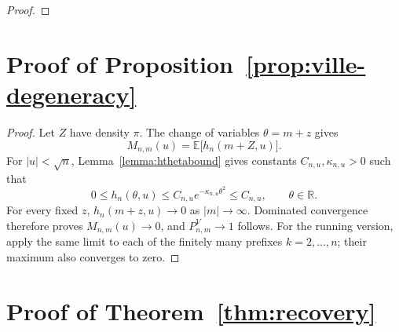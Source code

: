\documentclass{article}
\begin{document}
\begin{proof}
\end{proof}

\section{Proof of Proposition~\ref{prop:ville-degeneracy}}
\label{app:proof-degeneracy}

\begin{proof}
Let \(Z\) have density \(\pi\).  The change of variables
\(\theta=m+z\) gives
\[
  M_{n,m}(u)
  =
  \mathbb E\bigl[h_n(m+Z,u)\bigr].
\]
For \(\lvert u\rvert<\sqrt n\), Lemma~\ref{lemma:hthetabound} gives
constants \(C_{n,u},\kappa_{n,u}>0\) such that
\[
  0
  \leq
  h_n(\theta,u)
  \leq
  C_{n,u}e^{-\kappa_{n,u}\theta^2}
  \leq
  C_{n,u},
  \qquad \theta\in\mathbb R.
\]
For every fixed \(z\),
\(h_n(m+z,u)\to0\) as \(|m|\to\infty\).  Dominated convergence therefore proves $M_{n,m}(u)\to0$, and $P_{n,m}^V\to1$ follows. For the running version, apply the same limit to each of the finitely many prefixes $k=2,\ldots,n$; their maximum also converges to zero.

\end{proof}

\section{Proof of Theorem~\ref{thm:recovery}}
\label{app:proof-recovery}
\end{document}
